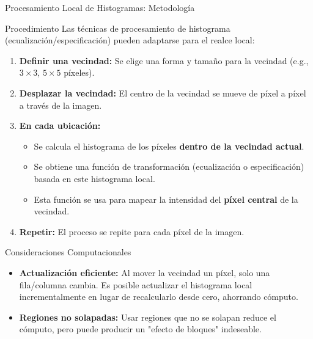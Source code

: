 \documentclass{beamer}
\begin{document}
\begin{frame}{Procesamiento Local de Histogramas: Metodología}\tiny
    \begin{block}{Procedimiento}
        Las técnicas de procesamiento de histograma (ecualización/especificación) pueden adaptarse para el realce local:
        \begin{enumerate}\footnotesize
            \item \textbf{Definir una vecindad:} Se elige una forma y tamaño para la vecindad (e.g., $3 \times 3$, $5 \times 5$ píxeles).
            \item \textbf{Desplazar la vecindad:} El centro de la vecindad se mueve de píxel a píxel a través de la imagen.
            \item \textbf{En cada ubicación:}
                \begin{itemize}\footnotesize
                    \item Se calcula el histograma de los píxeles \textbf{dentro de la vecindad actual}.
                    \item Se obtiene una función de transformación (ecualización o especificación) basada en este histograma local.
                    \item Esta función se usa para mapear la intensidad del \textbf{píxel central} de la vecindad.
                \end{itemize}
            \item \textbf{Repetir:} El proceso se repite para cada píxel de la imagen.
        \end{enumerate}
    \end{block}
    \begin{exampleblock}{Consideraciones Computacionales}
        \begin{itemize}
            \item \textbf{Actualización eficiente:} Al mover la vecindad un píxel, solo una fila/columna cambia. Es posible actualizar el histograma local incrementalmente en lugar de recalcularlo desde cero, ahorrando cómputo.
            \item \textbf{Regiones no solapadas:} Usar regiones que no se solapan reduce el cómputo, pero puede producir un "efecto de bloques" indeseable.
        \end{itemize}
    \end{exampleblock}
\end{frame}
\end{document}
